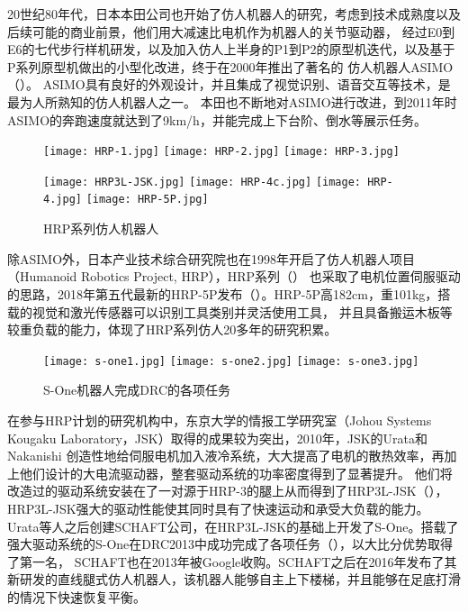 20世纪80年代，日本本田公司也开始了仿人机器人的研究，考虑到技术成熟度以及后续可能的商业前景，他们用大减速比电机作为机器人的关节驱动器，
经过E0到E6的七代步行样机研发，以及加入仿人上半身的P1到P2的原型机迭代，以及基于P系列原型机做出的小型化改进，终于在2000年推出了著名的
仿人机器人ASIMO（）。 ASIMO具有良好的外观设计，并且集成了视觉识别、语音交互等技术，是最为人所熟知的仿人机器人之一。
本田也不断地对ASIMO进行改进，到2011年时ASIMO的奔跑速度就达到了9km/h，并能完成上下台阶、倒水等展示任务\cite{Honda}。
\begin{figure}[htbp]
    \centering
        {%
            \texttt{[image: HRP-1.jpg]}}
        {%
            \texttt{[image: HRP-2.jpg]}}
        {%
            \texttt{[image: HRP-3.jpg]}}

        {%
            \texttt{[image: HRP3L-JSK.jpg]}}   
        {%
            \texttt{[image: HRP-4c.jpg]}}       
        {%
            \texttt{[image: HRP-4.jpg]}}       
        {%
            \texttt{[image: HRP-5P.jpg]}}       

    \caption{HRP系列仿人机器人\label{fig:japan_hrp}}
\end{figure}

除ASIMO外，日本产业技术综合研究院也在1998年开启了仿人机器人项目（Humanoid Robotics Project, HRP），HRP系列（）
也采取了电机位置伺服驱动的思路，2018年第五代最新的HRP-5P发布（）。HRP-5P高182cm，重101kg，搭载的视觉和激光传感器可以识别工具类别并灵活使用工具，
并且具备搬运木板等较重负载的能力\cite{HRP}，体现了HRP系列仿人20多年的研究积累。
\begin{figure}[htbp]
    \centering
    \texttt{[image: s-one1.jpg]}
    \texttt{[image: s-one2.jpg]}
    \texttt{[image: s-one3.jpg]}
    \caption{\label{fig:s-one}S-One机器人完成DRC的各项任务}
\end{figure}

在参与HRP计划的研究机构中，东京大学的情报工学研究室（Johou Systems Kougaku Laboratory，JSK）取得的成果较为突出，2010年，JSK的Urata和Nakanishi
创造性地给伺服电机加入液冷系统，大大提高了电机的散热效率，再加上他们设计的大电流驱动器，整套驱动系统的功率密度得到了显著提升。
他们将改造过的驱动系统安装在了一对源于HRP-3的腿上从而得到了HRP3L-JSK（），HRP3L-JSK强大的驱动性能使其同时具有了快速运动和承受大负载的能力。
Urata等人之后创建SCHAFT公司，在HRP3L-JSK的基础上开发了S-One。搭载了强大驱动系统的S-One在DRC2013中成功完成了各项任务（），以大比分优势取得了第一名，
SCHAFT也在2013年被Google收购。SCHAFT之后在2016年发布了其新研发的直线腿式仿人机器人，该机器人能够自主上下楼梯，并且能够在足底打滑的情况下快速恢复平衡\cite{SCHAFT}。
